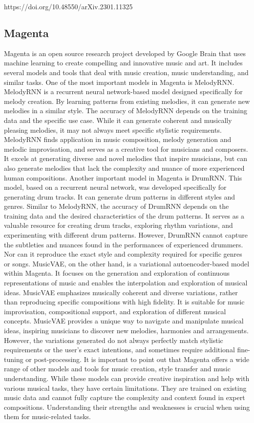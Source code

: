 \documentclass{article}
\begin{document}
https://doi.org/10.48550/arXiv.2301.11325


\subsection{Magenta}
Magenta is an open source research project developed by Google Brain that uses machine learning to create compelling and innovative music and art. It includes several models and tools that deal with music creation, music understanding, and similar tasks.
One of the most important models in Magenta is MelodyRNN. MelodyRNN is a recurrent neural network-based model designed specifically for melody creation. By learning patterns from existing melodies, it can generate new melodies in a similar style. The accuracy of MelodyRNN depends on the training data and the specific use case. While it can generate coherent and musically pleasing melodies, it may not always meet specific stylistic requirements. MelodyRNN finds application in music composition, melody generation and melodic improvisation, and serves as a creative tool for musicians and composers. It excels at generating diverse and novel melodies that inspire musicians, but can also generate melodies that lack the complexity and nuance of more experienced human compositions.
Another important model in Magenta is DrumRNN. This model, based on a recurrent neural network, was developed specifically for generating drum tracks. It can generate drum patterns in different styles and genres. Similar to MelodyRNN, the accuracy of DrumRNN depends on the training data and the desired characteristics of the drum patterns. It serves as a valuable resource for creating drum tracks, exploring rhythm variations, and experimenting with different drum patterns. However, DrumRNN cannot capture the subtleties and nuances found in the performances of experienced drummers. Nor can it reproduce the exact style and complexity required for specific genres or songs.
MusicVAE, on the other hand, is a variational autoencoder-based model within Magenta. It focuses on the generation and exploration of continuous representations of music and enables the interpolation and exploration of musical ideas. MusicVAE emphasizes musically coherent and diverse variations, rather than reproducing specific compositions with high fidelity. It is suitable for music improvisation, compositional support, and exploration of different musical concepts. MusicVAE provides a unique way to navigate and manipulate musical ideas, inspiring musicians to discover new melodies, harmonies and arrangements. However, the variations generated do not always perfectly match stylistic requirements or the user's exact intentions, and sometimes require additional fine-tuning or post-processing.
It is important to point out that Magenta offers a wide range of other models and tools for music creation, style transfer and music understanding. While these models can provide creative inspiration and help with various musical tasks, they have certain limitations. They are trained on existing music data and cannot fully capture the complexity and context found in expert compositions. Understanding their strengths and weaknesses is crucial when using them for music-related tasks.
\end{document}

